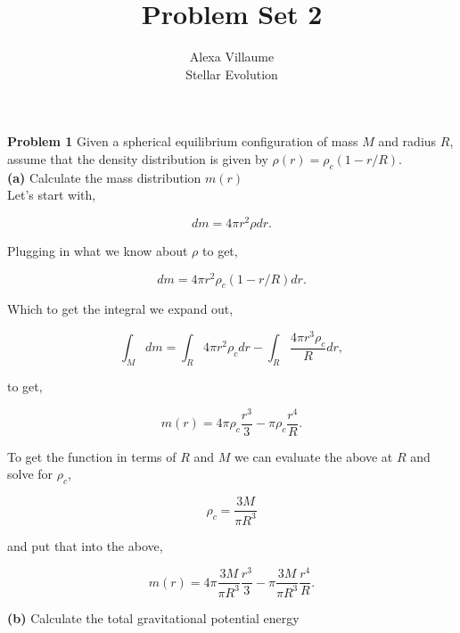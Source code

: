 \documentclass[12pt]{article}
\begin{document}
 
 \title{Problem Set 2}
\author{Alexa Villaume\\ 
Stellar Evolution } 
 
\maketitle
 
\noindent \textbf{Problem 1} Given a spherical equilibrium configuration of mass $M$ and radius $R$, assume that the density distribution is given by $\rho \left(r \right) = \rho_c\left ( 1- r/R\right )$.\\
\noindent \textbf{(a)} Calculate the mass distribution $m \left( r \right)$ \\

\noindent Let's start with, 

\begin{equation}
dm = 4\pi r^2 \rho dr.
\end{equation}

\noindent Plugging in what we know about $\rho$ to get,

\begin{equation}
dm = 4\pi r^2 \rho_c \left(1- r/R  \right)dr.
\end{equation}

\noindent Which to get the integral we expand out,

\begin{equation}
\int_M dm = \int_R 4\pi r^2 \rho_c  dr - \int_R \frac{4\pi r^3 \rho_c}{R}  dr,
\end{equation}

\noindent to get,

\begin{equation}
m\left ( r \right) = 4\pi \rho_c \frac{r^3}{3} - \pi \rho_c \frac{r^4}{R}.
\end{equation}

\noindent To get the function in terms of $R$ and $M$ we can evaluate the above at $R$ and solve for $\rho_c$,

\begin{equation}
\rho_c = \frac{3M}{\pi R^3}
\end{equation}

\noindent and put that into the above,

\begin{equation}
m\left ( r \right) = 4\pi \frac{3M}{\pi R^3}  \frac{r^3}{3} - \pi \frac{3M}{\pi R^3} \frac{r^4}{R}.
\end{equation}

\noindent \textbf{(b)} Calculate the total gravitational potential energy\\
\end{document}
